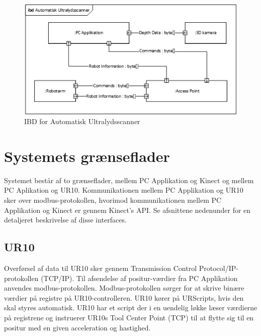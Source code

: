 \begin{figure}[H]
    \centering
    \includegraphics[width=1\textwidth]{figurer/d/Design/IBD}
    \caption{IBD for Automatisk Ultralydsscanner}
    \label{IBD}
\end{figure}

\section{Systemets grænseflader}
Systemet består af to grænseflader, mellem PC Applikation og Kinect og mellem PC Aplikation og UR10. Kommunikationen mellem PC Applikation og UR10 sker over modbus-protokollen, hvorimod kommunikationen mellem PC Applikation og Kinect er gennem Kinect's API.
Se afsnittene nedenunder for en detaljeret beskrivelse af disse interfaces.

\subsection{UR10}
Overførsel af data til UR10 sker gennem Transmission Control Protocol/IP-protokollen (TCP/IP). Til afsendelse af positur-værdier fra PC Applikation anvendes modbus-protokollen. Modbus-protokollen sørger for at skrive binære værdier på registre på UR10-controlleren. UR10 kører på URScripts, hvis den skal styres automatisk. UR10 har et script der i en uendelig løkke læser værdierne på registrene og instruerer UR10s Tool Center Point (TCP) til at flytte sig til en positur med en given acceleration og hastighed.

